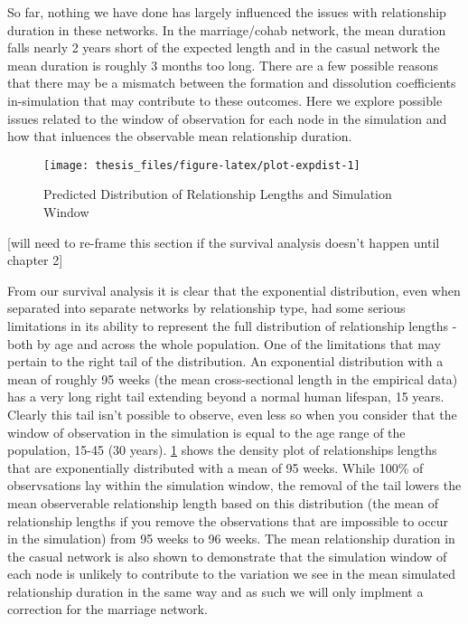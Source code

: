 \documentclass [11pt, proquest] {uwthesis}[2015/03/03]
\begin{document}
So far, nothing we have done has largely influenced the issues with
relationship duration in these networks. In the marriage/cohab network,
the mean duration falls nearly 2 years short of the expected length and
in the casual network the mean duration is roughly 3 months too long.
There are a few possible reasons that there may be a mismatch between
the formation and dissolution coefficients in-simulation that may
contribute to these outcomes. Here we explore possible issues related to
the window of observation for each node in the simulation and how that
inluences the observable mean relationship duration.
\begin{figure}

{\centering \texttt{[image: thesis\_files/figure-latex/plot-expdist-1]} 

}

\caption{Predicted Distribution of Relationship Lengths and Simulation Window}\label{fig:plot-expdist}
\end{figure}
{[}will need to re-frame this section if the survival analysis doesn't
happen until chapter 2{]}

From our survival analysis it is clear that the exponential
distribution, even when separated into separate networks by relationship
type, had some serious limitations in its ability to represent the full
distribution of relationship lengths - both by age and across the whole
population. One of the limitations that may pertain to the right tail of
the distribution. An exponential distribution with a mean of roughly 95
weeks (the mean cross-sectional length in the empirical data) has a very
long right tail extending beyond a normal human lifespan, 15 years.
Clearly this tail isn't possible to observe, even less so when you
consider that the window of observation in the simulation is equal to
the age range of the population, 15-45 (30 years).
\ref{fig:plot-expdist} shows the density plot of relationships lengths
that are exponentially distributed with a mean of 95 weeks. While 100\%
of observsations lay within the simulation window, the removal of the
tail lowers the mean observerable relationship length based on this
distribution (the mean of relationship lengths if you remove the
observations that are impossible to occur in the simulation) from 95
weeks to 96 weeks. The mean relationship duration in the casual network
is also shown to demonstrate that the simulation window of each node is
unlikely to contribute to the variation we see in the mean simulated
relationship duration in the same way and as such we will only implment
a correction for the marriage network.
\end{document}
